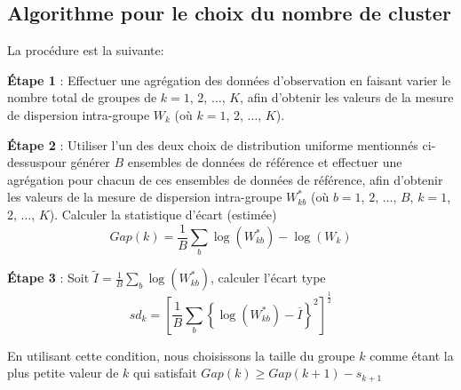 \subsection{Algorithme pour le choix du nombre de cluster}
La procédure est la suivante:

\textbf{Étape 1} : Effectuer une agrégation des données d'observation en faisant varier le nombre total de groupes de \(k = 1\), \(2\), \(\ldots\), \(K\), afin d'obtenir les valeurs de la mesure de dispersion intra-groupe \(W_{k}\) (où \(k = 1\), \(2\), \(\ldots\), \(K\)).

\textbf{Étape 2} : Utiliser l'un des deux choix de distribution uniforme mentionnés ci-dessuspour générer \(B\) ensembles de données de référence et effectuer une agrégation pour chacun de ces ensembles de données de référence, afin d'obtenir les valeurs de la mesure de dispersion intra-groupe \(W_{k b}^{*}\) (où \(b = 1\), \(2\), \(\ldots\), \(B\), \(k = 1\), \(2\), \(\ldots\), \(K\)). Calculer la statistique d'écart (estimée)
\[
Gap(k)=\frac{1}{B}\sum_{b}\log\left(W_{k b}^{*}\right)-\log\left(W_{k}\right)
\]

\textbf{Étape 3} : Soit \(\tilde{I}=\frac{1}{B}\sum_{b}\log (W_{k b}^{*})\), calculer l'écart type
\[
sd_{k}=\left[\frac{1}{B}\sum_{b}\left\{\log (W_{k b}^{*}) - \overline{I}\right\}^{2}\right]^{\frac{1}{2}}
\]

En utilisant cette condition, nous choisissons la taille du groupe \(k\) comme étant la plus petite valeur de \(k\) qui satisfait \(Gap(k) \geq Gap(k + 1) - s_{k + 1}\)



